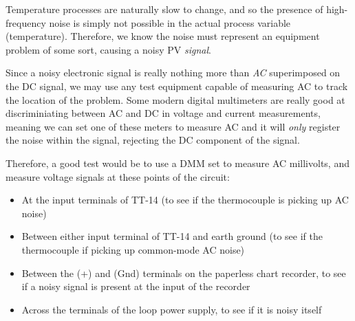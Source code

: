 
Temperature processes are naturally slow to change, and so the presence of high-frequency noise is simply not possible in the actual process variable (temperature).  Therefore, we know the noise must represent an equipment problem of some sort, causing a noisy PV {\it signal}.
 
\vskip 10pt

Since a noisy electronic signal is really nothing more than {\it AC} superimposed on the DC signal, we may use any test equipment capable of measuring AC to track the location of the problem.  Some modern digital multimeters are really good at discriminiating between AC and DC in voltage and current measurements, meaning we can set one of these meters to measure AC and it will {\it only} register the noise within the signal, rejecting the DC component of the signal.

\vskip 10pt

Therefore, a good test would be to use a DMM set to measure AC millivolts, and measure voltage signals at these points of the circuit:

\begin{itemize}
\item{} At the input terminals of TT-14 (to see if the thermocouple is picking up AC noise)
\item{} Between either input terminal of TT-14 and earth ground (to see if the thermocouple if picking up common-mode AC noise)
\item{} Between the (+) and (Gnd) terminals on the paperless chart recorder, to see if a noisy signal is present at the input of the recorder
\item{} Across the terminals of the loop power supply, to see if it is noisy itself
\end{itemize}











